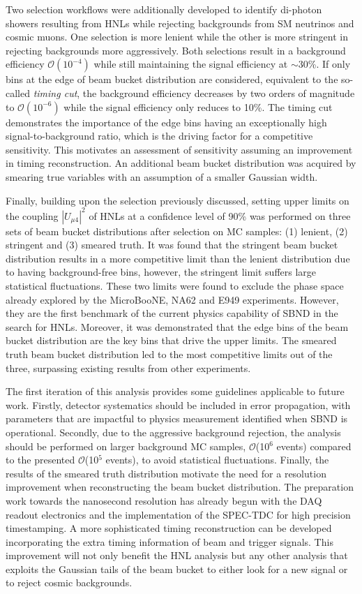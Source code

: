 Two selection workflows were additionally developed to identify di-photon showers resulting from HNLs while rejecting backgrounds from SM neutrinos and cosmic muons.
One selection is more lenient while the other is more stringent in rejecting backgrounds more aggressively.
Both selections result in a background efficiency $\mathcal{O}(10^{-4})$ while still maintaining the signal efficiency at $\sim$30\%.
If only bins at the edge of beam bucket distribution are considered, equivalent to the so-called \textit{timing cut}, the background efficiency decreases by two orders of magnitude to $\mathcal{O}(10^{-6})$ while the signal efficiency only reduces to 10\%. 
The timing cut demonstrates the importance of the edge bins having an exceptionally high signal-to-background ratio, which is the driving factor for a competitive sensitivity.
This motivates an assessment of sensitivity assuming an improvement in timing reconstruction.
An additional beam bucket distribution was acquired by smearing true variables with an assumption of a smaller Gaussian width.


Finally, building upon the selection previously discussed, setting upper limits on the coupling $|U_{\mu4}|^2$ of HNLs at a confidence level of 90\% was performed on three sets of beam bucket distributions after selection on MC samples: (1) lenient, (2) stringent and (3) smeared truth.  
It was found that the stringent beam bucket distribution results in a more competitive limit than the lenient distribution due to having background-free bins, however, the stringent limit suffers large statistical fluctuations.
These two limits were found to exclude the phase space already explored by the MicroBooNE, NA62 and E949 experiments.
However, they are the first benchmark of the current physics capability of SBND in the search for HNLs.
Moreover, it was demonstrated that the edge bins of the beam bucket distribution are the key bins that drive the upper limits.   
The smeared truth beam bucket distribution led to the most competitive limits out of the three, surpassing existing results from other experiments.  

The first iteration of this analysis provides some guidelines applicable to future work.
Firstly, detector systematics should be included in error propagation, with parameters that are impactful to physics measurement identified when SBND is operational.
Secondly, due to the aggressive background rejection, the analysis should be performed on larger background MC samples, $\mathcal{O}$(10$^6$ events) compared to the presented $\mathcal{
O}$(10$^5$ events), to avoid statistical fluctuations.
Finally, the results of the smeared truth distribution motivate the need for a resolution improvement when reconstructing the beam bucket distribution.
The preparation work towards the nanosecond resolution has already begun with the DAQ readout electronics and the implementation of the SPEC-TDC for high precision timestamping.  
A more sophisticated timing reconstruction can be developed incorporating the extra timing information of beam and trigger signals.
This improvement will not only benefit the HNL analysis but any other analysis that exploits the Gaussian tails of the beam bucket to either look for a new signal or to reject cosmic backgrounds.
